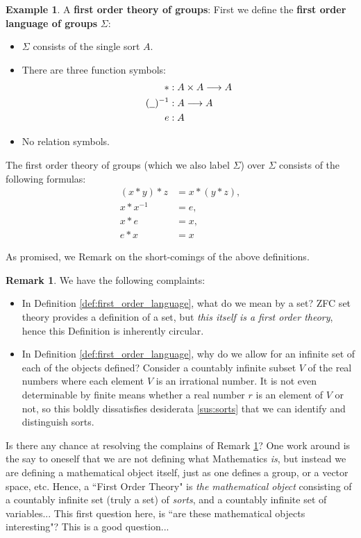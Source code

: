 \documentclass[12pt]{article}
\theoremstyle{plain}
\theoremstyle{definition}
\newtheorem{remark}[thm]{Remark}
\newtheorem{example}[thm]{Example}
\newcommand{\und}[1]{\underline{\hspace{#1 cm}}}
\newcommand{\lto}{\longrightarrow}
\begin{document}
	\begin{example}\label{ex:groups}
		A \textbf{first order theory of groups}:
		First we define the \textbf{first order language of groups} $\Sigma$:
		\begin{itemize}
			\item $\Sigma$ consists of the single sort $A$.
			\item There are three function symbols:
			\begin{align*}
				*&: A \times A \lto A\\
				(\und{0.2})^{-1}&: A \lto A\\
				e&: A
			\end{align*}
			\item No relation symbols.
		\end{itemize}
		The first order theory of groups (which we also label $\Sigma$) over $\Sigma$ consists of the following formulas:
		\begin{align*}
			(x * y) * z &= x * (y * z),\\
			x * x^{-1} &= e,\\
			x * e &= x,\\
			e * x &= x
		\end{align*}
	\end{example}
	As promised, we Remark on the short-comings of the above definitions.
	\begin{remark}\label{rmk:don't_believe_it}
		We have the following complaints:
		\begin{itemize}
			\item In Definition \ref{def:first_order_language}, what do we mean by a set? ZFC set theory provides a definition of a set, but \emph{this itself is a first order theory}, hence this Definition is inherently circular.
			\item In Definition \ref{def:first_order_language}, why do we allow for an infinite set of each of the objects defined? Consider a countably infinite subset $V$ of the real numbers where each element $V$ is an irrational number. It is not even determinable by finite means whether a real number $r$ is an element of $V$ or not, so this boldly dissatisfies desiderata \ref{sus:sorts} that we can identify and distinguish sorts.
		\end{itemize}
	\end{remark}
	Is there any chance at resolving the complains of Remark \ref{rmk:don't_believe_it}? One work around is the say to oneself that we are not defining what Mathematics \emph{is}, but instead we are defining a mathematical object itself, just as one defines a group, or a vector space, etc. Hence, a ``First Order Theory" is \emph{the mathematical object} consisting of a countably infinite set (truly a set) of \emph{sorts}, and a countably infinite set of variables... This first question here, is ``are these mathematical objects interesting"? This is a good question...
	
\end{document}

